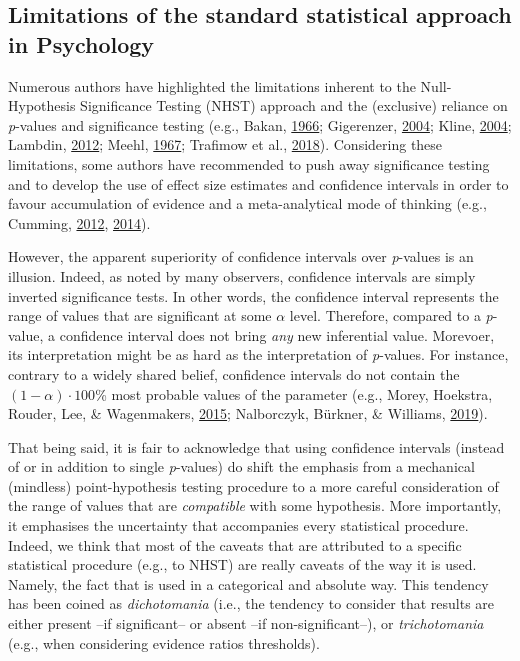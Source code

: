 \documentclass[a4paper,12pt,twoside,openright,oldfontcommands]{memoir}
\begin{document}
\subsection{Limitations of the standard statistical approach in
Psychology}\label{limitations-of-the-standard-statistical-approach-in-psychology}

Numerous authors have highlighted the limitations inherent to the
Null-Hypothesis Significance Testing (NHST) approach and the (exclusive)
reliance on \emph{p}-values and significance testing (e.g., Bakan,
\protect\hyperlink{ref-bakan_test_1966}{1966}; Gigerenzer,
\protect\hyperlink{ref-Gigerenzer2004}{2004}; Kline,
\protect\hyperlink{ref-Kline2004}{2004}; Lambdin,
\protect\hyperlink{ref-Lambdin2012}{2012}; Meehl,
\protect\hyperlink{ref-meehl_theory-testing_1967}{1967}; Trafimow et
al., \protect\hyperlink{ref-trafimow_manipulating_2018}{2018}).
Considering these limitations, some authors have recommended to push
away significance testing and to develop the use of effect size
estimates and confidence intervals in order to favour accumulation of
evidence and a meta-analytical mode of thinking (e.g., Cumming,
\protect\hyperlink{ref-Cumming2012}{2012},
\protect\hyperlink{ref-cumming_new_2014}{2014}).

However, the apparent superiority of confidence intervals over
\emph{p}-values is an illusion. Indeed, as noted by many observers,
confidence intervals are simply inverted significance tests. In other
words, the confidence interval represents the range of values that are
significant at some \(\alpha\) level. Therefore, compared to a
\emph{p}-value, a confidence interval does not bring \emph{any} new
inferential value. Morevoer, its interpretation might be as hard as the
interpretation of \emph{p}-values. For instance, contrary to a widely
shared belief, confidence intervals do not contain the
\((1 - \alpha) \cdot 100\)\% most probable values of the parameter
(e.g., Morey, Hoekstra, Rouder, Lee, \& Wagenmakers,
\protect\hyperlink{ref-morey_fallacy_2015}{2015}; Nalborczyk, Bürkner,
\& Williams, \protect\hyperlink{ref-nalborczyk_pragmatism_2019}{2019}).

That being said, it is fair to acknowledge that using confidence
intervals (instead of or in addition to single \emph{p}-values) do shift
the emphasis from a mechanical (mindless) point-hypothesis testing
procedure to a more careful consideration of the range of values that
are \emph{compatible} with some hypothesis. More importantly, it
emphasises the uncertainty that accompanies every statistical procedure.
Indeed, we think that most of the caveats that are attributed to a
specific statistical procedure (e.g., to NHST) are really caveats of the
way it is used. Namely, the fact that is used in a categorical and
absolute way. This tendency has been coined as \emph{dichotomania}
(i.e., the tendency to consider that results are either present --if
significant-- or absent --if non-significant--), or \emph{trichotomania}
(e.g., when considering evidence ratios thresholds).
\end{document}

